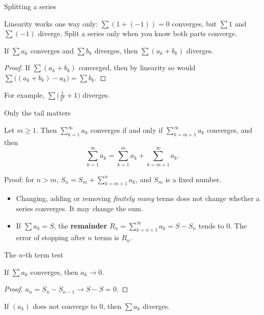 \documentclass[10pt]{wosm-slides}
\begin{document}
\begin{frame}{Splitting a series}
  \begin{warning}
    Linearity works one way only: $\sum (1 + (-1)) = 0$ converges, but $\sum 1$ and
    $\sum (-1)$ diverge. Split a series only when you know both parts converge.
  \end{warning}
  \pause
  \begin{corollary}
    If $\sum a_k$ converges and $\sum b_k$ diverges, then $\sum (a_k + b_k)$ diverges.
  \end{corollary}
  \begin{proof}
    If $\sum (a_k + b_k)$ converged, then by linearity so would
    $\sum \bigl((a_k + b_k) - a_k\bigr) = \sum b_k$.
  \end{proof}
  For example, $\sum \bigl(\frac1{2^k} + 1\bigr)$ diverges.
\end{frame}

\begin{frame}{Only the tail matters}
  \begin{theorem}
    Let $m \ge 1$. Then $\sum_{k=1}^\infty a_k$ converges if and only if
    $\sum_{k=m+1}^\infty a_k$ converges, and then
    \[ \sum_{k=1}^\infty a_k = \sum_{k=1}^{m} a_k + \sum_{k=m+1}^\infty a_k . \]
  \end{theorem}
  {\small Proof: for $n > m$, $S_n = S_m + \sum_{k=m+1}^{n} a_k$, and $S_m$ is a fixed number.\par}
  \pause
  \begin{itemize}
    \item Changing, adding or removing \emph{finitely many} terms does not change
      whether a series converges. It may change the sum.
    \item If $\sum a_k = S$, the \textbf{remainder}
      $R_n = \sum_{k=n+1}^\infty a_k = S - S_n$ tends to $0$.
      The error of stopping after $n$ terms is $R_n$.
  \end{itemize}
\end{frame}

\begin{frame}{The $n$-th term test}
  \begin{theorem}
    If $\sum a_k$ converges, then $a_k \to 0$.
  \end{theorem}
  \begin{proof}
    $a_n = S_n - S_{n-1} \to S - S = 0$.
  \end{proof}
  \pause
  \begin{corollary}
    If $(a_k)$ does not converge to $0$, then $\sum a_k$ diverges.
  \end{corollary}
\end{frame}
\end{document}
